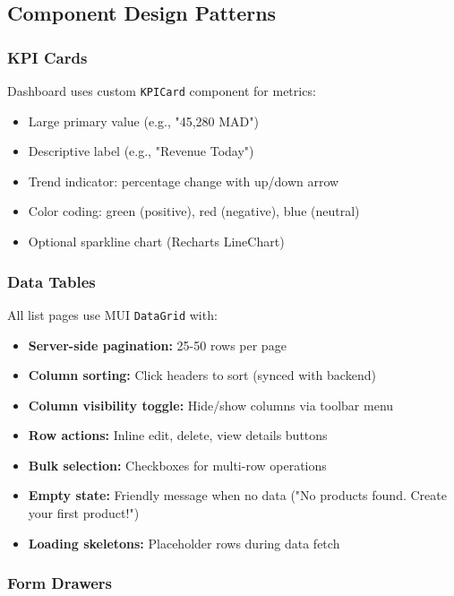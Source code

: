\subsection{Component Design Patterns}

\subsubsection{KPI Cards}

Dashboard uses custom \texttt{KPICard} component for metrics:

\begin{itemize}
    \item Large primary value (e.g., "45,280 MAD")
    \item Descriptive label (e.g., "Revenue Today")
    \item Trend indicator: percentage change with up/down arrow
    \item Color coding: green (positive), red (negative), blue (neutral)
    \item Optional sparkline chart (Recharts LineChart)
\end{itemize}

\subsubsection{Data Tables}

All list pages use MUI \texttt{DataGrid} with:

\begin{itemize}
    \item \textbf{Server-side pagination:} 25-50 rows per page
    \item \textbf{Column sorting:} Click headers to sort (synced with backend)
    \item \textbf{Column visibility toggle:} Hide/show columns via toolbar menu
    \item \textbf{Row actions:} Inline edit, delete, view details buttons
    \item \textbf{Bulk selection:} Checkboxes for multi-row operations
    \item \textbf{Empty state:} Friendly message when no data ("No products found. Create your first product!")
    \item \textbf{Loading skeletons:} Placeholder rows during data fetch
\end{itemize}

\subsubsection{Form Drawers}

